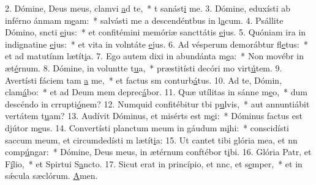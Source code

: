 2. Dómine, Deus meus, clamvi \uline{a}d te,~* t sanást\uline{i} me.
3. Dómine, eduxísti ab inférno ánmam m\uline{e}am:~* salvásti me a descendéntbus in l\uline{a}cum.
4. Psállite Dómino, sncti \uline{e}jus:~* et confitémini memóriæ sancttátis \uline{e}jus.
5. Quóniam ira in indignatine \uline{e}jus:~* et vita in volntáte \uline{e}jus.
6. Ad vésperum demorábtur fl\uline{e}tus:~* et ad matutínm lætít\uline{i}a.
7. Ego autem dixi in abundánta m\uline{e}a:~* Non movébr in æt\uline{é}rnum.
8. Dómine, in voluntte t\uline{u}a,~* præstitísti decóri mo virt\uline{ú}tem.
9. Avertísti fáciem tam \uline{a} me,~* et factus sm conturb\uline{á}tus.
10. Ad te, Dómin, clam\uline{á}bo:~* et ad Deum mem deprec\uline{á}bor.
11. Quæ utílitas in sánne m\uline{e}o,~* dum descéndo in crrupti\uline{ó}nem?
12. Numquid confitébitur tbi p\uline{u}lvis,~* aut annuntiábit vertátem t\uline{u}am?
13. Audívit Dóminus, et misérts est m\uline{e}i:~* Dóminus factus est djútor m\uline{e}us.
14. Convertísti planctum meum in gáudum m\uline{i}hi:~* conscidísti saccum meum, et circumdedísti m lætít\uline{i}a:
15. Ut cantet tibi glória mea, et nn comp\uline{ú}ngar:~* Dómine, Deus meus, in ætérnum conftébor t\uline{i}bi.
16. Glória Patr, et F\uline{í}lio,~* et Spirtui S\uline{a}ncto.
17. Sicut erat in princípio, et nnc, et s\uline{e}mper,~* et in sǽcula sæclórum. \uline{A}men.
